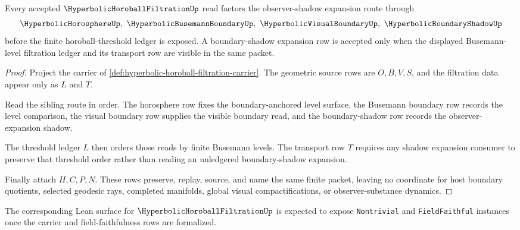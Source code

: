 \begin{theorem}
\label{thm:hyperbolic-horoball-shadow-vision-concretization}
Every accepted $\HyperbolicHoroballFiltrationUp$ read factors the observer-shadow expansion route through
$$
\HyperbolicHorosphereUp,\ \HyperbolicBusemannBoundaryUp,\ \HyperbolicVisualBoundaryUp,\ \HyperbolicBoundaryShadowUp
$$
before the finite horoball-threshold ledger is exposed. A boundary-shadow expansion row is accepted only when the displayed Busemann-level filtration ledger and its transport row are visible in the same packet.
\end{theorem}
\begin{proof}
Project the carrier of \autoref{def:hyperbolic-horoball-filtration-carrier}. The geometric source rows are $O,B,V,S$, and the filtration data appear only as $L$ and $T$.

Read the sibling route in order. The horosphere row fixes the boundary-anchored level surface, the Busemann boundary row records the level comparison, the visual boundary row supplies the visible boundary read, and the boundary-shadow row records the observer-expansion shadow.

The threshold ledger $L$ then orders those reads by finite Busemann levels. The transport row $T$ requires any shadow expansion consumer to preserve that threshold order rather than reading an unledgered boundary-shadow expansion.

Finally attach $H,C,P,N$. These rows preserve, replay, source, and name the same finite packet, leaving no coordinate for host boundary quotients, selected geodesic rays, completed manifolds, global visual compactifications, or observer-substance dynamics.
\end{proof}

The corresponding Lean surface for $\HyperbolicHoroballFiltrationUp$ is expected to expose \texttt{Nontrivial} and \texttt{FieldFaithful} instances once the carrier and field-faithfulness rows are formalized.



